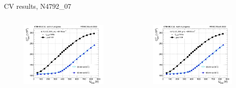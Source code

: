 \documentclass{beamer}
\begin{document}
\begin{frame}{CV results, N4792\_07}
  \begin{columns}
    \begin{figure}
        \includegraphics[width=1.0\textwidth]{plots/8in_198ch_2019_N4792_7_neg40degC_annealing_CV_ch101.png}    
    \end{figure}
    \begin{figure}
        \includegraphics[width=1.0\textwidth]{plots/8in_198ch_2019_N4792_7_neg40degC_annealing_CV_ch109.png}    
    \end{figure}
  \end{columns}
\end{frame}
\end{document}
